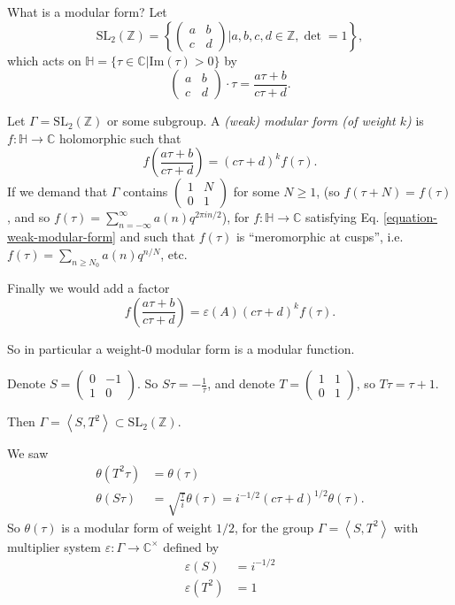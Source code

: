 \medskip\noindent
What is a modular form? Let 
$$
\text{SL}_2(\mathbb{Z})=\left\{ 
\begin{pmatrix}
a&b\\ 
c&d
\end{pmatrix}|a,b,c,d \in \mathbb{Z}, \det =1 \right\}, 
$$
which acts on $\mathbb{H}=\{\tau \in \mathbb{C}|\text{Im}(\tau)>0\}$ by
 $$
\begin{pmatrix}
a&b\\ 
c&d
\end{pmatrix}\cdot\tau=\frac{a\tau+b}{c\tau+d}.
$$
\begin{definition}
\label{definition-weak-modular-form}
Let $\Gamma=\text{SL}_2(\mathbb{Z})$ or some subgroup.
A {\it (weak) modular form (of weight $k$)} is $f:\mathbb{H}\to \mathbb{C}$ 
holomorphic such that
\begin{equation}
\label{equation-weak-modular-form}
f\left(\frac{a\tau+b}{c\tau+d}\right)=(c\tau+d)^kf(\tau).
\end{equation}
If we demand that $\Gamma$
 contains $\begin{pmatrix}
1&N\\ 
0&1
\end{pmatrix}$ for some $N\geq 1$,
(so $f(\tau+N)=f(\tau)$, and so $f(\tau)
=\sum_{n=-\infty}^\infty a(n)q^{2\pi in/2}$), for $f:\mathbb{H}\to
\mathbb{C}$ satisfying Eq. \ref{equation-weak-modular-form} and such that
 $f(\tau)$ is ``meromorphic at cusps'', i.e.
$f(\tau)=\sum_{n \geq N_0}a(n)q^{n/N}$, etc.

Finally we would add a factor
$$
f\left(\frac{a\tau+b}{c\tau+d}\right)=
\varepsilon(A)(c\tau+d)^kf(\tau).
$$
\end{definition}

So in particular a weight-0 modular form is a modular function.

Denote $S=\begin{pmatrix}
0&-1\\ 
1&0
\end{pmatrix}$. So $S\tau=-\frac{1}{\tau}$, and denote 
$T=\begin{pmatrix}
1&1\\ 
0&1
\end{pmatrix}$, so $T\tau = \tau+1$.

Then $\Gamma=\left<S,T^2\right>\subset \text{SL}_2(\mathbb{Z})$.

We saw
\begin{align*}
\theta(T^2\tau)&=\theta(\tau)\\
\theta(S\tau)&=\sqrt{\frac{\tau}{i}}\theta(\tau)=i^{-1/2}
(c\tau+d)^{1/2}\theta(\tau).
\end{align*}
So $\theta(\tau)$ is a modular form of weight $1/2$, for the group
$\Gamma=\left<S,T^2\right>$ with multiplier
system $\varepsilon:\Gamma \to \mathbb{C}^\times$ defined by
\begin{align*}
\varepsilon(S)&=i^{-1/2}\\
\varepsilon(T^2)&=1
\end{align*}

